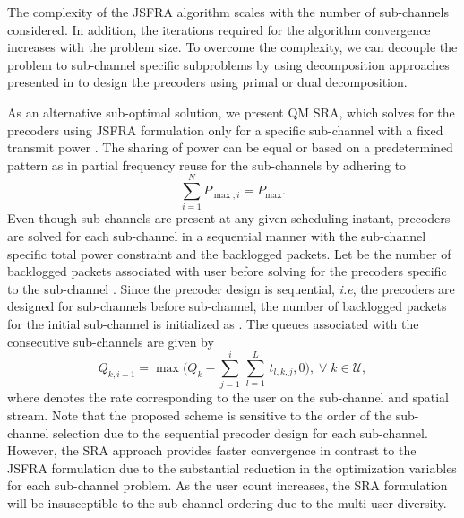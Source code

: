 
The complexity of the \ac{JSFRA} algorithm scales with the number of sub-channels considered. In addition, the iterations required for the algorithm convergence increases with the problem size. To overcome the complexity, we can decouple the problem to sub-channel specific subproblems by using decomposition approaches presented in \cite{palomar2006tutorial,boyd2011distributed} to design the precoders using primal or dual decomposition. 

As an alternative sub-optimal solution, we present \acl{QM} \ac{SRA}, which solves for the precoders using \ac{JSFRA} formulation only for a specific sub-channel  with a fixed transmit power . The sharing of power can be equal or based on a predetermined pattern as in partial frequency reuse for the sub-channels by adhering to 
\begin{equation}
\sum_{i=1}^N P_{\max,i} = P_{\max}.
\end{equation}
Even though  sub-channels are present at any given scheduling instant, precoders are solved for each sub-channel in a sequential manner with the sub-channel specific total power constraint  and the backlogged packets. Let  be the number of backlogged packets associated with user  before solving for the precoders specific to the sub-channel . Since the precoder design is sequential, \textit{i.e}, the precoders are designed for sub-channels \me{[0,i-1]} before  sub-channel, the number of backlogged packets for the initial sub-channel is initialized as . The queues associated with the consecutive sub-channels are given by
\begin{equation}	\label{eqn-weight}
	Q_{k,i+1} = \max \Big ( Q_k - \sum_{j = 1}^{i} \, \sum_{l = 1}^{L} \, t_{l,k,j} ,0 \Big ), \; \forall \; k \in \mathcal{U},
\end{equation}
where  denotes the rate corresponding to the user  on the  sub-channel and  spatial stream. Note that the proposed scheme is sensitive to the order of the sub-channel selection due to the sequential precoder design for each sub-channel. However, the \ac{SRA} approach provides faster convergence in contrast to the \ac{JSFRA} formulation due to the substantial reduction in the optimization variables for each sub-channel problem. As the user count increases, the \ac{SRA} formulation will be insusceptible to the sub-channel ordering due to the multi-user diversity.
